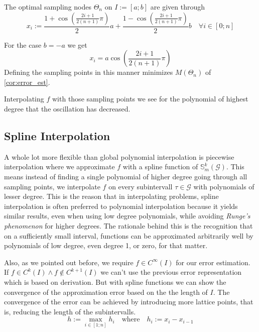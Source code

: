 \begin{definition}
   The optimal sampling nodes \(\Theta_n\) on \(I := [a; b]\) are given through
   \[x_i := \frac{1 + \cos\left(\frac{2i + 1}{2(n+1)} \pi\right)}{2}a + \frac{1 - \cos\left(\frac{2i + 1}{2(n+1)} \pi\right)}{2}b \quad \forall i \in [0; n]\]
\end{definition}
\begin{remark}
   For the case \(b = -a\) we get
   \[x_i = a \cos\left(\frac{2i + 1}{2(n+1)} \pi\right)\]
   Defining the sampling points in this manner minimizes \(M(\Theta_n)\) of \cref{cor:error_est}.
\end{remark}


Interpolating \(f\) with those sampling points we see for the polynomial of highest degree that the oscillation has decreased.
\begin{center}
   
\end{center}

\subsection{Spline Interpolation}\label{sec:piece_inter}
A whole lot more flexible than global polynomial interpolation is piecewise interpolation where we approximate \(f\) with a spline function of \(\mathbb{S}_m^k(\mathcal{G})\).
This means instead of finding a single polynomial of higher degree going through all sampling points, we interpolate \(f\) on every subintervall \(\tau \in \mathcal{G}\) with polynomials of lesser degree.
This is the reason that in interpolating problems, spline interpolation is often preferred to polynomial interpolation because it yields similar results, even when using low degree polynomials, while avoiding \emph{Runge's phenomenon} for higher degrees.
The rationale behind this is the recognition that on a sufficiently small interval, functions can be approximated arbitrarily well by polynomials of low degree, even degree 1, or zero, for that matter.

Also, as we pointed out before, we require \(f \in C^\infty(I)\) for our error estimation.
If \(f \in C^k(I) \land f \notin C^{k+1}(I)\) we can't use the previous error representation which is based on derivation.
But with spline functions we can show the convergence of the approximation error based on the the length of \(I\).
The convergence of the error can be achieved by introducing more lattice points, that is, reducing the length of the subintervalls.
\[h := \max_{i \in [1;n]} h_i \quad\text{where}\quad h_i := x_i - x_{i-1}\]


